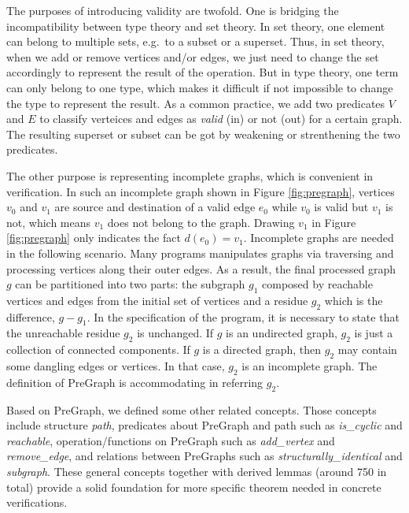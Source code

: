 The purposes of introducing validity are twofold. One is bridging the
incompatibility between type theory and set theory. In set theory, one
element can belong to multiple sets, e.g.\ to a subset or a
superset. Thus, in set theory, when we add or remove vertices and/or
edges, we just need to change the set accordingly to represent the
result of the operation. But in type theory, one term can only belong
to one type, which makes it difficult if not impossible to change the
type to represent the result. As a common practice, we add two
predicates $V$ and $E$ to classify verteices and edges as \emph{valid}
(in) or not (out) for a certain graph. The resulting superset or
subset can be got by weakening or strenthening the two predicates.

The other purpose is representing incomplete graphs, which is
convenient in verification. In such an incomplete graph shown in
{\color{magenta}Figure \ref{fig:pregraph}}, vertices $v_0$ and $v_1$
are source and destination of a valid edge $e_0$ while $v_0$ is valid
but $v_1$ is not, which means $v_1$ does not belong to the
graph. Drawing $v_1$ in Figure \ref{fig:pregraph} only indicates the
fact $d(e_0) = v_1$. Incomplete graphs are needed in the following
scenario. Many programs manipulates graphs via traversing and
processing vertices along their outer edges. As a result, the final
processed graph $g$ can be partitioned into two parts: the subgraph
$g_1$ composed by reachable vertices and edges from the initial set of
vertices and a residue $g_2$ which is the difference, $g - g_1$. In
the specification of the program, it is necessary to state that the
unreachable residue $g_2$ is unchanged. If $g$ is an undirected graph,
$g_2$ is just a collection of connected components. If $g$ is a
directed graph, then $g_2$ may contain some dangling edges or
vertices. In that case, $g_2$ is an incomplete graph. The definition
of PreGraph is accommodating in referring $g_2$.

Based on PreGraph, we defined some other related concepts. Those
concepts include structure \emph{path}, predicates about PreGraph and
path such as \emph{is\_cyclic} and \emph{reachable},
operation/functions on PreGraph such as \emph{add\_vertex}
and \emph{remove\_edge}, and relations between PreGraphs such
as \emph{structurally\_identical} and \emph{subgraph}.  These general
concepts together with derived lemmas (around 750 in total) provide a
solid foundation for more specific theorem needed in concrete
verifications.

